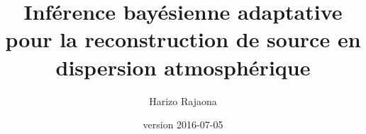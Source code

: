 \documentclass{book}
\title{Inférence bayésienne adaptative pour la reconstruction de source en dispersion atmosphérique}
\date{version 2016-07-05}
\author{Harizo Rajaona}
\begin{document}
	

	\maketitle
	

	\renewcommand{\contentsname}{Sommaire} %
	
	\tableofcontents
	
	\newpage
	\listoffigures
	
	
	
	

	
	
	
	
	
	
	
	
	
	
	

	
	
	
\end{document}
